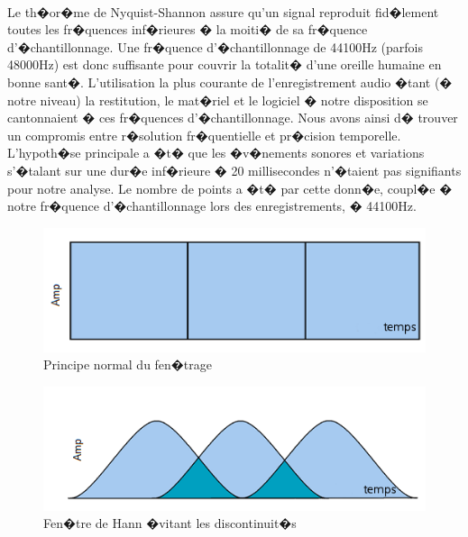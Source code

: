 \paragraph{}
  Le th�or�me de Nyquist-Shannon\cite{nyquistshannon} assure qu'un signal reproduit fid�lement toutes les fr�quences inf�rieures � la moiti� 
	de sa fr�quence d'�chantillonnage. Une fr�quence d'�chantillonnage de 44100Hz (parfois 48000Hz) est donc suffisante 
	pour couvrir la totalit� d'une oreille humaine en bonne sant�. L'utilisation la plus courante de l'enregistrement 
	audio �tant (� notre niveau) la restitution, le mat�riel et le logiciel � notre disposition se cantonnaient � ces 
	fr�quences d'�chantillonnage. Nous avons ainsi d� trouver un compromis entre r�solution fr�quentielle et pr�cision 
	temporelle. L'hypoth�se principale a �t� que les �v�nements sonores et variations s'�talant sur une dur�e inf�rieure 
	� 20 millisecondes n'�taient pas signifiants pour notre analyse. Le nombre de points a �t� par cette donn�e, coupl�e 
	� notre fr�quence d'�chantillonnage lors des enregistrements, � 44100Hz.
\begin{figure}[H]
	    \begin{center}
		    \includegraphics[width=12cm]{Images/fenetrenormale.png} 
	    \end{center}
	    \caption{Principe normal du fen�trage}
\end{figure}
\begin{figure}[H]
	    \begin{center}
		    \includegraphics[width=12cm]{Images/fenetrehann.png} 
	    \end{center}
	    \caption{Fen�tre de Hann �vitant les discontinuit�s}
\end{figure}
